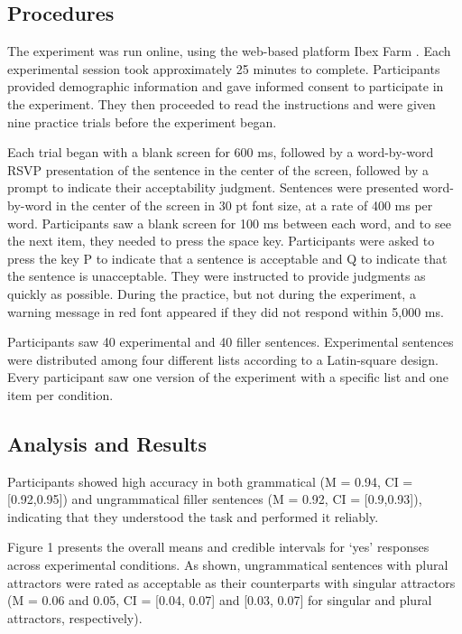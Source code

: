 \documentclass[
  authoryear,
  3p]{elsarticle}
\begin{document}
\subsection{Procedures}\label{procedures}

The experiment was run online, using the web-based platform Ibex Farm
\citep{Drummond2013}. Each experimental session took approximately 25
minutes to complete. Participants provided demographic information and
gave informed consent to participate in the experiment. They then
proceeded to read the instructions and were given nine practice trials
before the experiment began.

Each trial began with a blank screen for 600 ms, followed by a
word-by-word RSVP presentation of the sentence in the center of the
screen, followed by a prompt to indicate their acceptability judgment.
Sentences were presented word-by-word in the center of the screen in 30
pt font size, at a rate of 400 ms per word. Participants saw a blank
screen for 100 ms between each word, and to see the next item, they
needed to press the space key. Participants were asked to press the key
P to indicate that a sentence is acceptable and Q to indicate that the
sentence is unacceptable. They were instructed to provide judgments as
quickly as possible. During the practice, but not during the experiment,
a warning message in red font appeared if they did not respond within
5,000 ms.

Participants saw 40 experimental and 40 filler sentences. Experimental
sentences were distributed among four different lists according to a
Latin-square design. Every participant saw one version of the experiment
with a specific list and one item per condition.

\subsection{Analysis and Results}\label{analysis-and-results}

Participants showed high accuracy in both grammatical (M = 0.94, CI =
{[}0.92,0.95{]}) and ungrammatical filler sentences (M = 0.92, CI =
{[}0.9,0.93{]}), indicating that they understood the task and performed
it reliably.

Figure 1 presents the overall means and credible intervals for `yes'
responses across experimental conditions. As shown, ungrammatical
sentences with plural attractors were rated as acceptable as their
counterparts with singular attractors (M = 0.06 and 0.05, CI = {[}0.04,
0.07{]} and {[}0.03, 0.07{]} for singular and plural attractors,
respectively).
\end{document}
